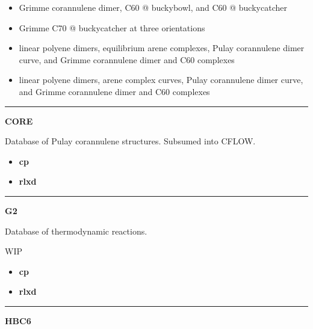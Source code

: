 \documentclass[letterpaper,10pt,english]{sphinxmanual}
\begin{document}
\begin{itemize}
\begin{itemize}
\item {} 
 Grimme corannulene dimer, C60 @ buckybowl, and C60 @ buckycatcher

\item {} 
 Grimme C70 @ buckycatcher at three orientations

\item {} 
 linear polyene dimers, equilibrium arene complexes, Pulay corannulene dimer curve, and Grimme corannulene dimer and C60 complexes

\item {} 
 linear polyene dimers, arene complex curves, Pulay corannulene dimer curve, and Grimme corannulene dimer and C60 complexes

\end{itemize}

\end{itemize}


\bigskip\hrule{}\bigskip

\label{db:module-CORE}
\textbf{CORE}

Database of Pulay corannulene structures. Subsumed into CFLOW.
\begin{itemize}
\item {} 
\textbf{cp}   \textbar{}\textbar{} 

\item {} 
\textbf{rlxd} 

\end{itemize}


\bigskip\hrule{}\bigskip

\label{db:module-G2}
\textbf{G2}

\begin{DUlineblock}{0em}
\item[] Database of thermodynamic reactions.
\item[] WIP
\end{DUlineblock}
\begin{itemize}
\item {} 
\textbf{cp}  

\item {} 
\textbf{rlxd} 

\end{itemize}


\bigskip\hrule{}\bigskip

\label{db:module-HBC6}
\textbf{HBC6}
\end{document}
